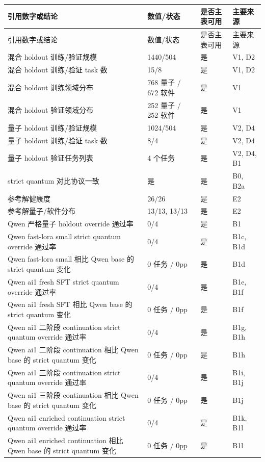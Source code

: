 \documentclass[11pt,a4paper]{article}
\begin{document}
\small
\begin{longtable}{p{3.8cm} p{2.2cm} p{1.4cm} p{4.8cm}}
\toprule
引用数字或结论 & 数值/状态 & 是否主表可用 & 主要来源 \\
\midrule
\endfirsthead
\toprule
引用数字或结论 & 数值/状态 & 是否主表可用 & 主要来源 \\
\midrule
\endhead
混合 holdout 训练/验证规模 & 1440/504 & 是 & V1, D2 \\
混合 holdout 训练/验证 task 数 & 15/8 & 是 & V1, D2 \\
混合 holdout 训练领域分布 & 768 量子 / 672 软件 & 是 & V1 \\
混合 holdout 验证领域分布 & 252 量子 / 252 软件 & 是 & V1 \\
量子 holdout 训练/验证规模 & 1024/504 & 是 & V2, D4 \\
量子 holdout 训练/验证 task 数 & 8/4 & 是 & V2, D4 \\
量子 holdout 验证任务列表 & 4 个任务 & 是 & V2, D4, B1 \\
strict quantum 对比协议一致 & 是 & 是 & B0, B2a \\
参考解健康度 & 26/26 & 是 & E2 \\
参考解量子/软件分布 & 13/13, 13/13 & 是 & E2 \\
Qwen 严格量子 holdout override 通过率 & 0/4 & 是 & B1 \\
Qwen fast-lora small strict quantum override 通过率 & 0/4 & 是 & B1c, B1d \\
Qwen fast-lora small 相比 Qwen base 的 strict quantum 变化 & 0 任务 / 0pp & 是 & B1d \\
Qwen ai1 fresh SFT strict quantum override 通过率 & 0/4 & 是 & B1e, B1f \\
Qwen ai1 fresh SFT 相比 Qwen base 的 strict quantum 变化 & 0 任务 / 0pp & 是 & B1f \\
Qwen ai1 二阶段 continuation strict quantum override 通过率 & 0/4 & 是 & B1g, B1h \\
Qwen ai1 二阶段 continuation 相比 Qwen base 的 strict quantum 变化 & 0 任务 / 0pp & 是 & B1h \\
Qwen ai1 三阶段 continuation strict quantum override 通过率 & 0/4 & 是 & B1i, B1j \\
Qwen ai1 三阶段 continuation 相比 Qwen base 的 strict quantum 变化 & 0 任务 / 0pp & 是 & B1j \\
Qwen ai1 enriched continuation strict quantum override 通过率 & 0/4 & 是 & B1k, B1l \\
Qwen ai1 enriched continuation 相比 Qwen base 的 strict quantum 变化 & 0 任务 / 0pp & 是 & B1l \\

\end{longtable}
\end{document}
